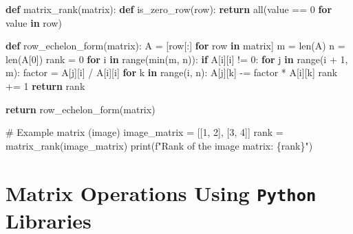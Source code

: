 \documentclass[
  letterpaper,
  DIV=11,
  numbers=noendperiod]{scrreprt}
\newenvironment{Shaded}{\begin{snugshade}}{\end{snugshade}}
\newcommand{\BuiltInTok}[1]{\textcolor[rgb]{0.00,0.23,0.31}{#1}}
\newcommand{\CommentTok}[1]{\textcolor[rgb]{0.37,0.37,0.37}{#1}}
\newcommand{\ControlFlowTok}[1]{\textcolor[rgb]{0.00,0.23,0.31}{\textbf{#1}}}
\newcommand{\DecValTok}[1]{\textcolor[rgb]{0.68,0.00,0.00}{#1}}
\newcommand{\KeywordTok}[1]{\textcolor[rgb]{0.00,0.23,0.31}{\textbf{#1}}}
\newcommand{\NormalTok}[1]{\textcolor[rgb]{0.00,0.23,0.31}{#1}}
\newcommand{\OperatorTok}[1]{\textcolor[rgb]{0.37,0.37,0.37}{#1}}
\newcommand{\SpecialCharTok}[1]{\textcolor[rgb]{0.37,0.37,0.37}{#1}}
\newcommand{\SpecialStringTok}[1]{\textcolor[rgb]{0.13,0.47,0.30}{#1}}
\theoremstyle{plain}
\theoremstyle{definition}
\theoremstyle{remark}
\begin{document}
\begin{Shaded}
\begin{Highlighting}[]
\KeywordTok{def}\NormalTok{ matrix\_rank(matrix):}
    \KeywordTok{def}\NormalTok{ is\_zero\_row(row):}
        \ControlFlowTok{return} \BuiltInTok{all}\NormalTok{(value }\OperatorTok{==} \DecValTok{0} \ControlFlowTok{for}\NormalTok{ value }\KeywordTok{in}\NormalTok{ row)}

    \KeywordTok{def}\NormalTok{ row\_echelon\_form(matrix):}
\NormalTok{        A }\OperatorTok{=}\NormalTok{ [row[:] }\ControlFlowTok{for}\NormalTok{ row }\KeywordTok{in}\NormalTok{ matrix]}
\NormalTok{        m }\OperatorTok{=} \BuiltInTok{len}\NormalTok{(A)}
\NormalTok{        n }\OperatorTok{=} \BuiltInTok{len}\NormalTok{(A[}\DecValTok{0}\NormalTok{])}
\NormalTok{        rank }\OperatorTok{=} \DecValTok{0}
        \ControlFlowTok{for}\NormalTok{ i }\KeywordTok{in} \BuiltInTok{range}\NormalTok{(}\BuiltInTok{min}\NormalTok{(m, n)):}
            \ControlFlowTok{if}\NormalTok{ A[i][i] }\OperatorTok{!=} \DecValTok{0}\NormalTok{:}
                \ControlFlowTok{for}\NormalTok{ j }\KeywordTok{in} \BuiltInTok{range}\NormalTok{(i }\OperatorTok{+} \DecValTok{1}\NormalTok{, m):}
\NormalTok{                    factor }\OperatorTok{=}\NormalTok{ A[j][i] }\OperatorTok{/}\NormalTok{ A[i][i]}
                    \ControlFlowTok{for}\NormalTok{ k }\KeywordTok{in} \BuiltInTok{range}\NormalTok{(i, n):}
\NormalTok{                        A[j][k] }\OperatorTok{{-}=}\NormalTok{ factor }\OperatorTok{*}\NormalTok{ A[i][k]}
\NormalTok{                rank }\OperatorTok{+=} \DecValTok{1}
        \ControlFlowTok{return}\NormalTok{ rank}

    \ControlFlowTok{return}\NormalTok{ row\_echelon\_form(matrix)}

\CommentTok{\# Example matrix (image)}
\NormalTok{image\_matrix }\OperatorTok{=}\NormalTok{ [[}\DecValTok{1}\NormalTok{, }\DecValTok{2}\NormalTok{], [}\DecValTok{3}\NormalTok{, }\DecValTok{4}\NormalTok{]]}
\NormalTok{rank }\OperatorTok{=}\NormalTok{ matrix\_rank(image\_matrix)}
\BuiltInTok{print}\NormalTok{(}\SpecialStringTok{f"Rank of the image matrix: }\SpecialCharTok{\{}\NormalTok{rank}\SpecialCharTok{\}}\SpecialStringTok{"}\NormalTok{)}
\end{Highlighting}
\end{Shaded}

\section{\texorpdfstring{Matrix Operations Using \texttt{Python}
Libraries}{Matrix Operations Using Python Libraries}}\label{matrix-operations-using-python-libraries}
\end{document}
